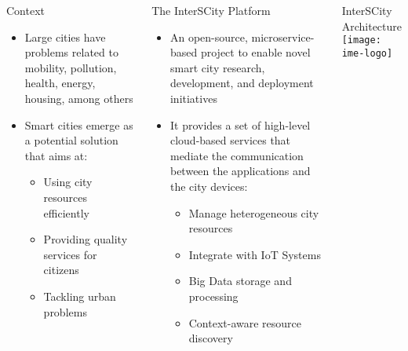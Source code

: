 \documentclass[
  xcolor={hyperref,svgnames,x11names,table},
  hyperref={pdfencoding=unicode,plainpages=false,pdfpagelabels=true,breaklinks=true},
  brazilian,english,
]{beamer}
\newcommand\halfcol{\column{.46\textwidth}}
\begin{document}
\begin{frame}[fragile]
\begin{columns}[T]
  \halfcol

  \begin{block}{Context}
    \begin{itemize}
      \item Large cities have problems related to mobility, pollution,
            health, energy, housing, among others
      \item Smart cities emerge as a potential solution that aims at:
      \begin{itemize}
        \item Using city resources efficiently
        \item Providing quality services for citizens
        \item Tackling urban problems
      \end{itemize}
    \end{itemize}
  \end{block}

  \begin{block}{The InterSCity Platform}
    \begin{itemize}
      \item An open-source, microservice-based project to enable novel
            smart city research, development, and deployment initiatives
      \item It provides a set of high-level cloud-based services that
            mediate the communication between the applications and the
            city devices:
      \begin{itemize}
        \item Manage heterogeneous city resources
        \item Integrate  with IoT Systems
        \item Big Data storage and processing
        \item Context-aware resource discovery
      \end{itemize}
    \end{itemize}
  \end{block}

  \halfcol

  \begin{block}{InterSCity Architecture}
      \centering
      \texttt{[image: ime-logo]}
  \end{block}

\end{columns}


\end{frame}
\end{document}

